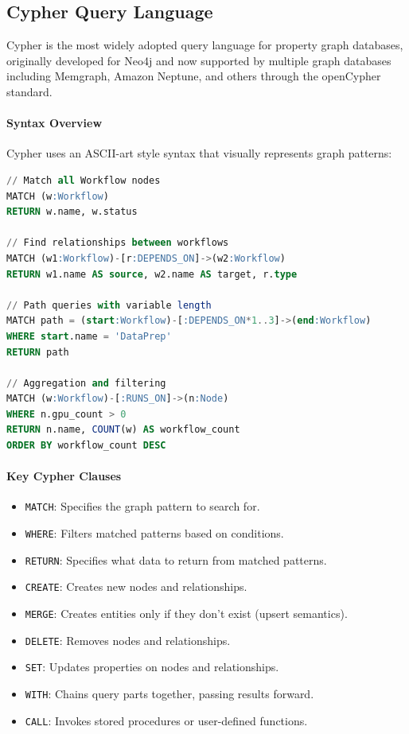 \subsection{Cypher Query Language}

Cypher is the most widely adopted query language for property graph databases, originally developed for Neo4j and now supported by multiple graph databases including Memgraph, Amazon Neptune, and others through the openCypher standard.

\paragraph{Syntax Overview}

Cypher uses an ASCII-art style syntax that visually represents graph patterns:

\begin{lstlisting}[language=SQL,caption={Basic Cypher query examples}]
// Match all Workflow nodes
MATCH (w:Workflow)
RETURN w.name, w.status

// Find relationships between workflows
MATCH (w1:Workflow)-[r:DEPENDS_ON]->(w2:Workflow)
RETURN w1.name AS source, w2.name AS target, r.type

// Path queries with variable length
MATCH path = (start:Workflow)-[:DEPENDS_ON*1..3]->(end:Workflow)
WHERE start.name = 'DataPrep'
RETURN path

// Aggregation and filtering
MATCH (w:Workflow)-[:RUNS_ON]->(n:Node)
WHERE n.gpu_count > 0
RETURN n.name, COUNT(w) AS workflow_count
ORDER BY workflow_count DESC
\end{lstlisting}

\paragraph{Key Cypher Clauses}

\begin{itemize}
    \item \texttt{MATCH}: Specifies the graph pattern to search for.
    \item \texttt{WHERE}: Filters matched patterns based on conditions.
    \item \texttt{RETURN}: Specifies what data to return from matched patterns.
    \item \texttt{CREATE}: Creates new nodes and relationships.
    \item \texttt{MERGE}: Creates entities only if they don't exist (upsert semantics).
    \item \texttt{DELETE}: Removes nodes and relationships.
    \item \texttt{SET}: Updates properties on nodes and relationships.
    \item \texttt{WITH}: Chains query parts together, passing results forward.
    \item \texttt{CALL}: Invokes stored procedures or user-defined functions.
\end{itemize}

